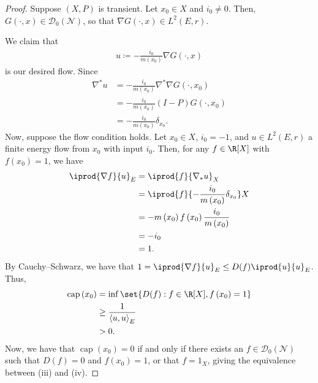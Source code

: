 \documentclass[10pt]{mypackage}
\renewcommand{\coloneq}{\coloneqq}
\begin{document}
\begin{proof}
  Suppose $\left( X,P \right)$ is transient. Let $x_0\in X$ and $i_0\neq 0$. Then, $G\left( \cdot,x \right)\in \mathcal{D}_0\left( \mathcal{N} \right)$, so that $\nabla G\left( \cdot,x \right)\in L^2\left( E,r \right)$.

  We claim that
  \begin{align*}
    u \coloneq -\frac{i_0}{m\left( x_0 \right)}\nabla G\left( \cdot,x \right)
  \end{align*}
  is our desired flow. Since
  \begin{align*}
    \nabla^{\ast}u &= -\frac{i_0}{m\left( x_0 \right)}\nabla^{\ast}\nabla G\left( \cdot,x_0 \right)\\
                   &= -\frac{i_0}{m\left( x_0 \right)}\left( I-P \right)G\left( \cdot,x_0 \right)\\
                   &= -\frac{i_0}{m\left( x_0 \right)} \delta_{x_0}.
  \end{align*}
  Now, suppose the flow condition holds. Let $x_0\in X$, $i_0 = -1$, and $u\in L^2\left( E,r \right)$ a finite energy flow from $x_0$ with input $i_0$. Then, for any $f\in \R[X]$ with $f\left( x_0 \right) = 1$, we have
  \begin{align*}
    \iprod{\nabla f}{u}_{E} &= \iprod{f}{\nabla_{\ast}u}_X\\
                            &= \iprod{f}{-\frac{i_0}{m\left( x_0 \right)}\delta_{x_0}}X\\
                            &= -m\left( x_0 \right)f\left( x_0 \right)\frac{i_0}{m\left( x_0 \right)}\\
                            &= -i_0\\
                            &= 1.
  \end{align*}
  By Cauchy--Schwarz, we have that $1 = \iprod{\nabla f}{u}_{E}\leq D(f) \iprod{u}{u}_{E}$. Thus,
  \begin{align*}
    \operatorname{cap}\left( x_0 \right) &= \inf\set{D(f) : f\in \R[X],f\left( x_0 \right) = 1}\\
                                         &\geq \frac{1}{\left\langle u,u \right\rangle_{E}}\\
                                         &> 0.
  \end{align*}
  Now, we have that $\operatorname{cap}\left( x_0 \right) = 0$ if and only if there exists an $f\in \mathcal{D}_0\left( \mathcal{N} \right)$ such that $D(f) = 0$ and $f\left( x_0 \right) = 1$, or that $f = 1_X$, giving the equivalence between (iii) and (iv).


\end{proof}
\end{document}

